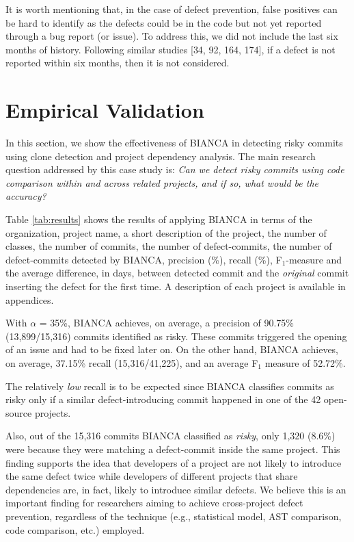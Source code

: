 \documentclass[12pt]{report}
\begin{document}
It is worth mentioning that, in the case of defect prevention, false
positives can be hard to identify as the defects could be in the code
but not yet reported through a bug report (or issue). To address this,
we did not include the last six months of history. Following similar
studies {[}34, 92, 164, 174{]}, if a defect is not reported within six
months, then it is not considered.

\section{Empirical Validation}\label{empirical-validation-2}

In this section, we show the effectiveness of BIANCA in detecting risky
commits using clone detection and project dependency analysis. The main
research question addressed by this case study is: \emph{Can we detect
risky commits using code comparison within and across related projects,
and if so, what would be the accuracy?}

Table \ref{tab:results} shows the results of applying BIANCA in terms of
the organization, project name, a short description of the project, the
number of classes, the number of commits, the number of defect-commits,
the number of defect-commits detected by BIANCA, precision (\%), recall
(\%), F\(_1\)-measure and the average difference, in days, between
detected commit and the \emph{original} commit inserting the defect for
the first time. A description of each project is available in
appendices.

With \(\alpha\) = 35\%, BIANCA achieves, on average, a precision of
90.75\% (13,899/15,316) commits identified as risky. These commits
triggered the opening of an issue and had to be fixed later on. On the
other hand, BIANCA achieves, on average, 37.15\% recall (15,316/41,225),
and an average F\(_1\) measure of 52.72\%.



The relatively \emph{low} recall is to be expected since BIANCA
classifies commits as risky only if a similar defect-introducing commit
happened in one of the 42 open-source projects.

Also, out of the 15,316 commits BIANCA classified as \emph{risky}, only
1,320 (8.6\%) were because they were matching a defect-commit inside the
same project. This finding supports the idea that developers of a
project are not likely to introduce the same defect twice while
developers of different projects that share dependencies are, in fact,
likely to introduce similar defects. We believe this is an important
finding for researchers aiming to achieve cross-project defect
prevention, regardless of the technique (e.g., statistical model, AST
comparison, code comparison, etc.) employed.
\end{document}
